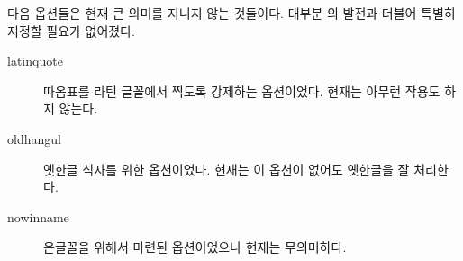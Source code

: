\documentclass[
	12pt,
	a4paper,
	kosection,
	footnote,
	nobookmarks,
	microtype,
	figtabcapt,
]{oblivoir}
\newcommand\obclass{ob\-liv\-oir\oblivoirallowbreak}
\begin{document}
\bigskip

다음 옵션들은 현재 큰 의미를 지니지 않는 것들이다. 대부분 \koTeX 의 발전과 더불어  특별히 지정할 필요가 없어졌다.
\begin{description}
\item [latinquote] 따옴표를 라틴 글꼴에서 찍도록 강제하는 옵션이었다. 현재는 아무런 작용도 하지 않는다.
\item [oldhangul] 옛한글 식자를 위한 옵션이었다. 현재는 이 옵션이 없어도 옛한글을 잘 처리한다.
\item [nowinname] 은글꼴을 위해서 마련된 옵션이었으나 현재는 무의미하다.
\end{description}


\end{document}
